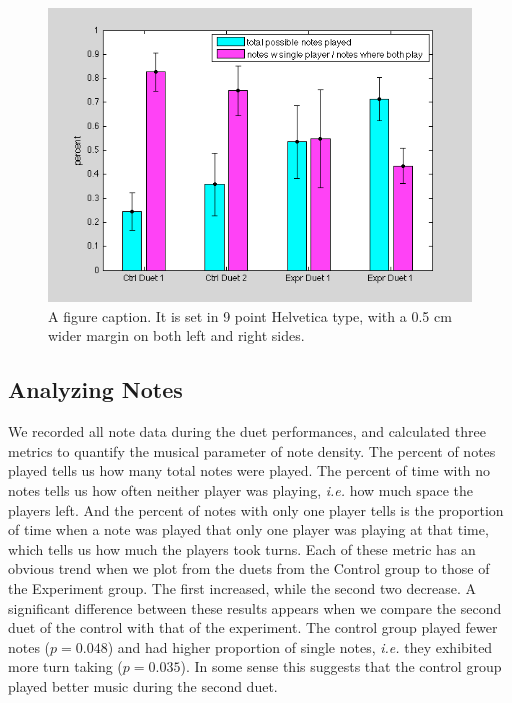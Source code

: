 \documentclass{article}
\begin{document}
\begin{figure}[tb]
\includegraphics[width=\columnwidth]{note-stats.png}
\caption{A figure caption.  It is set in 9 point Helvetica type, with a
0.5 cm wider margin on both left and right sides.} 
\label{fig-example}
\end{figure}


\subsection{Analyzing Notes}

We recorded all note data during the duet performances, and calculated three metrics to quantify the musical parameter of note density. The percent of notes played tells us how many total notes were played. The percent of time with no notes tells us how often neither player was playing, \emph{i.e.} how much space the players left. And the percent of notes with only one player tells is the proportion of time when a note was played that only one player was playing at that time, which tells us how much the players took turns. Each of these metric has an obvious trend when we plot from the duets from the Control group to those of the Experiment group.  The first increased, while the second two decrease.  A significant difference between these results appears when we compare the second duet of the control with that of the experiment. The control group played fewer notes ($p = 0.048$) and had higher proportion of single notes, \emph{i.e.} they exhibited more turn taking ($p = 0.035$). In some sense this suggests that the control group played better music during the second duet. 
\end{document}
